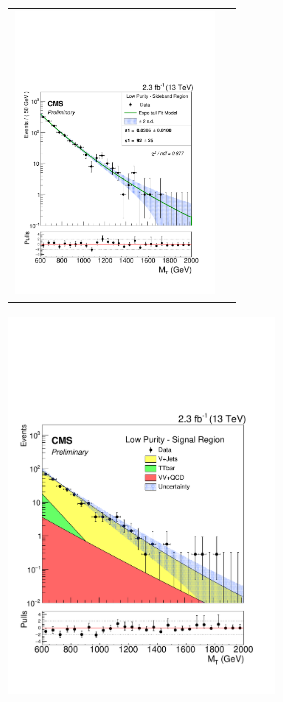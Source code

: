 \begin{figure}[!ht]
\begin{tabular}{cc}
\includegraphics[width=150pt]{figuresARC/fits/sbData_MVZLP.pdf}\\
\end{tabular}
\begin{center}
  \includegraphics[width=200pt]{figuresARC/fits/finalresultUBLP.pdf}
\end{center}
\label{fig:fits4}
\end{figure}

